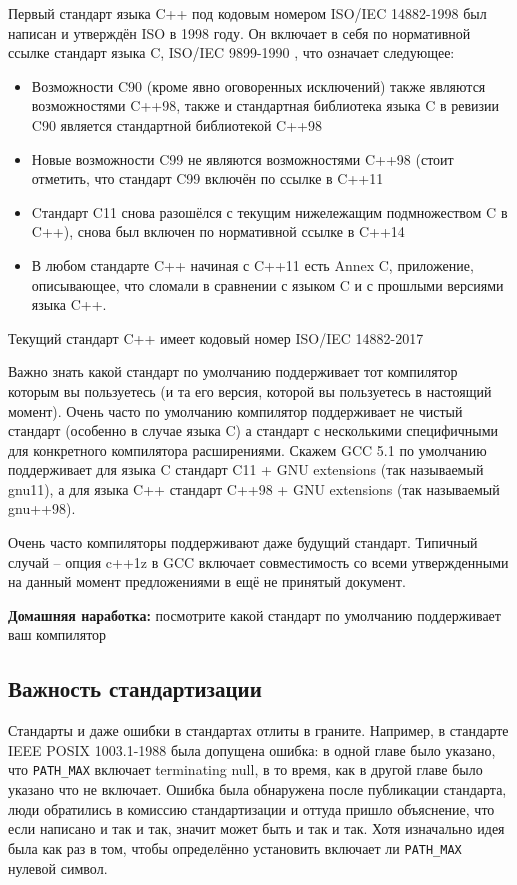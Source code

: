 \documentclass[a4paper,12pt,oneside]{book}
\begin{document}
Первый стандарт языка C++ под кодовым номером ISO/IEC 14882-1998 \cite{stdcpp98} был написан и утверждён ISO в 1998 году. Он включает в себя по нормативной ссылке стандарт языка C, ISO/IEC 9899-1990 \cite{stdc90}, что означает следующее: 

\begin{itemize}
\item
Возможности C90 (кроме явно оговоренных исключений) также являются возможностями C++98, также и стандартная библиотека языка C в ревизии C90 является стандартной библиотекой C++98
\item
Новые возможности C99 \cite{stdc90} не являются возможностями C++98 (стоит отметить, что стандарт C99 включён по ссылке в C++11 \cite{stdcpp11}
\item
Cтандарт C11 \cite{stdc11} снова разошёлся с текущим нижележащим подмножеством C в C++), снова был включен по нормативной ссылке в C++14 \cite{stdcpp14}
\item
В любом стандарте C++ начиная с C++11 есть Annex C, приложение, описывающее, что сломали в сравнении с языком C и с прошлыми версиями языка C++.
\end{itemize}

Текущий стандарт C++ имеет кодовый номер ISO/IEC 14882-2017

Важно знать какой стандарт по умолчанию поддерживает тот компилятор которым вы пользуетесь (и та его версия, которой вы пользуетесь в настоящий момент). Очень часто по умолчанию компилятор поддерживает не чистый стандарт (особенно в случае языка C) а стандарт с несколькими специфичными для конкретного компилятора расширениями. Скажем GCC 5.1 по умолчанию поддерживает для языка C стандарт C11 + GNU extensions (так называемый gnu11), а для языка C++ стандарт C++98 + GNU extensions (так называемый gnu++98).

Очень часто компиляторы поддерживают даже будущий стандарт. Типичный случай -- опция c++1z в GCC включает совместимость со всеми утвержденными на данный момент предложениями в ещё не принятый документ.

\textbf{Домашняя наработка:} посмотрите какой стандарт по умолчанию поддерживает ваш компилятор

\subsection{Важность стандартизации}\label{StandartizationImportance}

Стандарты и даже ошибки в стандартах отлиты в граните. Например, в стандарте IEEE POSIX 1003.1-1988 была допущена ошибка: в одной главе было указано, что \lstinline!PATH_MAX! включает terminating null, в то время, как в другой главе было указано что не включает. Ошибка была обнаружена после публикации стандарта, люди обратились в комиссию стандартизации и оттуда пришло объяснение, что если написано и так и так, значит может быть и так и так. Хотя изначально идея была как раз в том, чтобы определённо установить включает ли \lstinline!PATH_MAX! нулевой символ.
\end{document}
